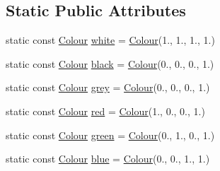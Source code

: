 \subsection*{Static Public Attributes}
\begin{DoxyCompactItemize}
\item 
static const \hyperlink{structkglt_1_1_colour}{Colour} \hyperlink{structkglt_1_1_colour_a6270d1bd69cade4ff78ea7ee89f7260f}{white} = \hyperlink{structkglt_1_1_colour}{Colour}(1., 1., 1., 1.)
\item 
static const \hyperlink{structkglt_1_1_colour}{Colour} \hyperlink{structkglt_1_1_colour_a8804856e77d8e545b677a987c596f65a}{black} = \hyperlink{structkglt_1_1_colour}{Colour}(0., 0., 0., 1.)
\item 
static const \hyperlink{structkglt_1_1_colour}{Colour} \hyperlink{structkglt_1_1_colour_a3c7750e3d02c1d9f65baafb91ed8b455}{grey} = \hyperlink{structkglt_1_1_colour}{Colour}(0., 0., 0., 1.)
\item 
static const \hyperlink{structkglt_1_1_colour}{Colour} \hyperlink{structkglt_1_1_colour_a26163cb6ecb152c434c4f736cf6b8510}{red} = \hyperlink{structkglt_1_1_colour}{Colour}(1., 0., 0., 1.)
\item 
static const \hyperlink{structkglt_1_1_colour}{Colour} \hyperlink{structkglt_1_1_colour_a50badab251d0583dccd5e0892e9cdc02}{green} = \hyperlink{structkglt_1_1_colour}{Colour}(0., 1., 0., 1.)
\item 
static const \hyperlink{structkglt_1_1_colour}{Colour} \hyperlink{structkglt_1_1_colour_a75fa8717d966a906c62f7c3b87de4cae}{blue} = \hyperlink{structkglt_1_1_colour}{Colour}(0., 0., 1., 1.)
\end{DoxyCompactItemize}


